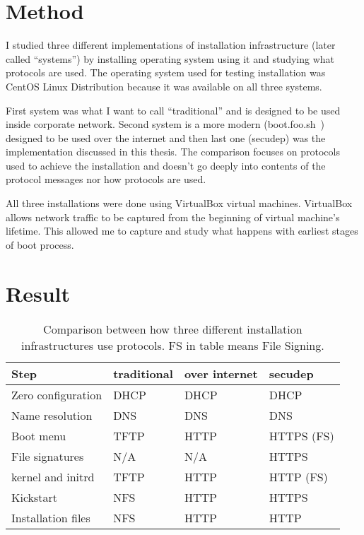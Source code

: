 
\section{Method}

I studied three different implementations of installation
infrastructure (later called ``systems'') by installing operating
system using it and studying what protocols are used. The operating
system used for testing installation was CentOS Linux Distribution
because it was available on all three systems.

First system was what I want to call ``traditional'' and is designed
to be used inside corporate network. Second system is a more modern
(boot.foo.sh~\cite{boot-foo-sh}) designed to be used over the internet
and then last one (secudep) was the implementation discussed in this
thesis. The comparison focuses on protocols used to achieve the
installation and doesn't go deeply into contents of the protocol
messages nor how protocols are used.

All three installations were done using VirtualBox virtual
machines. VirtualBox allows network traffic to be captured from the
beginning of virtual machine's lifetime. This allowed me to capture
and study what happens with earliest stages of boot process.

\section{Result}

\begin{table}[!ht]
  \def\arraystretch{1.1}%
  \begin{center}
    \label{tab:comparison_table}
    \begin{tabular}{| l | l | l | l |}
      \hline
      Step               & traditional & over internet & secudep    \\
      \hline
      Zero configuration & DHCP        & DHCP          & DHCP       \\
      Name resolution    & DNS         & DNS           & DNS        \\
      Boot menu          & TFTP        & HTTP          & HTTPS (FS) \\
      File signatures    & N/A         & N/A           & HTTPS      \\
      kernel and initrd  & TFTP        & HTTP          & HTTP (FS)  \\
      Kickstart          & NFS         & HTTP          & HTTPS      \\
      Installation files & NFS         & HTTP          & HTTP       \\
      \hline
    \end{tabular}
    \caption{Comparison between how three different installation
      infrastructures use protocols. FS in table means File Signing.}
  \end{center}
\end{table}

